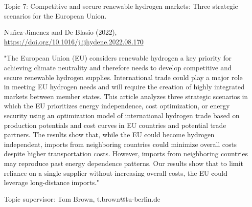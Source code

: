 \documentclass[10pt,aspectratio=169,dvipsnames]{beamer}
\begin{document}
\begin{frame}
  \begin{block}{Topic 7: Competitive and secure renewable hydrogen markets: Three strategic scenarios for the European Union.}
      
    Nuñez-Jimenez and De Blasio (2022), 
    \href{https://doi.org/10.1016/j.ijhydene.2022.08.170}{https://doi.org/10.1016/j.ijhydene.2022.08.170}
    
    "The European Union (EU) considers renewable hydrogen a key priority for achieving climate neutrality and therefore needs to develop competitive and secure renewable hydrogen supplies. International trade could play a major role in meeting EU hydrogen needs and will require the creation of highly integrated markets between member states. This article analyzes three strategic scenarios in which the EU prioritizes energy independence, cost optimization, or energy security using an optimization model of international hydrogen trade based on production potentials and cost curves in EU countries and potential trade partners. The results show that, while the EU could become hydrogen independent, imports from neighboring countries could minimize overall costs despite higher transportation costs. However, imports from neighboring countries may reproduce past energy dependence patterns. Our results show that to limit reliance on a single supplier without increasing overall costs, the EU could leverage long-distance imports."

    \hfill
    Topic supervisor:  Tom Brown, t.brown@tu-berlin.de
    
  \end{block}
\end{frame}
\end{document}
